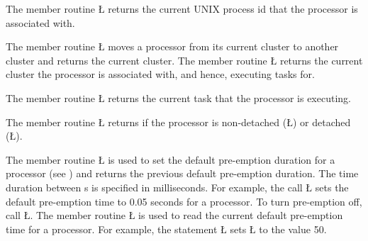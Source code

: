 \documentclass[openright,twoside]{report}
\begin{document}
The member routine \LGinlinetrue\LGbegin\lgrinde\L{}\endlgrinde\LGend{} returns the current UNIX process id that the processor is associated with.

The member routine \LGinlinetrue\LGbegin\lgrinde\L{}\endlgrinde\LGend{} moves a processor from its current cluster to another cluster and returns the current cluster.
The member routine \LGinlinetrue\LGbegin\lgrinde\L{}\endlgrinde\LGend{} returns the current cluster the processor is associated with, and hence, executing tasks for.

The member routine \LGinlinetrue\LGbegin\lgrinde\L{}\endlgrinde\LGend{} returns the current task that the processor is executing.

The member routine \LGinlinetrue\LGbegin\lgrinde\L{}\endlgrinde\LGend{} returns if the processor is non-detached (\LGinlinetrue\LGbegin\lgrinde\L{}\endlgrinde\LGend{}) or detached (\LGinlinetrue\LGbegin\lgrinde\L{}\endlgrinde\LGend{}).

The member routine \LGinlinetrue\LGbegin\lgrinde\L{}\endlgrinde\LGend{} is used to set the default pre-emption duration for a processor (see ) and returns the previous default pre-emption duration.
The time duration between s is specified in milliseconds.
For example, the call \LGinlinetrue\LGbegin\lgrinde\L{}\endlgrinde\LGend{} sets the default pre-emption time to 0.05 seconds for a processor.
To turn pre-emption off, call \LGinlinetrue\LGbegin\lgrinde\L{}\endlgrinde\LGend{}.
The member routine \LGinlinetrue\LGbegin\lgrinde\L{}\endlgrinde\LGend{} is used to read the current default pre-emption time for a processor.
For example, the statement \LGinlinetrue\LGbegin\lgrinde\L{}\endlgrinde\LGend{} sets \LGinlinetrue\LGbegin\lgrinde\L{}\endlgrinde\LGend{} to the value 50.
\end{document}
